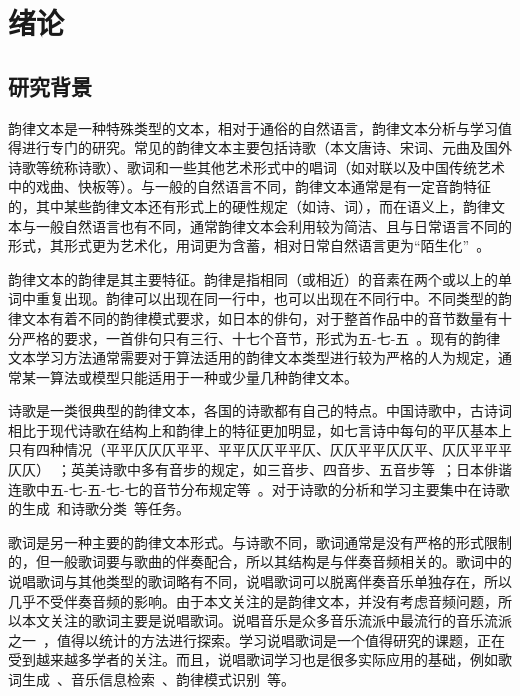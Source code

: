 \chapter{绪论} \label{chpt:A}

\section{研究背景}
韵律文本是一种特殊类型的文本，相对于通俗的自然语言，韵律文本分析与学习值得进行专门的研究。常见的韵律文本主要包括诗歌（本文唐诗、宋词、元曲及国外诗歌等统称诗歌）、歌词和一些其他艺术形式中的唱词（如对联以及中国传统艺术中的戏曲、快板等）。与一般的自然语言不同，韵律文本通常是有一定音韵特征的，其中某些韵律文本还有形式上的硬性规定（如诗、词），而在语义上，韵律文本与一般自然语言也有不同，通常韵律文本会利用较为简洁、且与日常语言不同的形式，其形式更为艺术化，用词更为含蓄，相对日常自然语言更为“陌生化”~\autocite{xiao2008mosheng}。\par

韵律文本的韵律是其主要特征。韵律是指相同（或相近）的音素在两个或以上的单词中重复出现。韵律可以出现在同一行中，也可以出现在不同行中。不同类型的韵律文本有着不同的韵律模式要求，如日本的俳句，对于整首作品中的音节数量有十分严格的要求，一首俳句只有三行、十七个音节，形式为五-七-五~\autocite{wang2016paiju}。现有的韵律文本学习方法通常需要对于算法适用的韵律文本类型进行较为严格的人为规定，通常某一算法或模型只能适用于一种或少量几种韵律文本。\par

诗歌是一类很典型的韵律文本，各国的诗歌都有自己的特点。中国诗歌中，古诗词相比于现代诗歌在结构上和韵律上的特征更加明显，如七言诗中每句的平仄基本上只有四种情况（平平仄仄仄平平、平平仄仄平平仄、仄仄平平仄仄平、仄仄平平平仄仄）~\autocite{song2009pingze}；英美诗歌中多有音步的规定，如三音步、四音步、五音步等~\autocite{zhao2007yingmei}；日本俳谐连歌中五-七-五-七-七的音节分布规定等~\autocite{wang2016paiju}。对于诗歌的分析和学习主要集中在诗歌的生成~\autocite{oliveira2012poetryme,kurzweil2001ray, jiang2015jiyu,he2012generating,mikolov2010recurrent,zhang2014chinese}和诗歌分类~\autocite{jamal2012poetry,lou2015multilabel}等任务。\par

歌词是另一种主要的韵律文本形式。与诗歌不同，歌词通常是没有严格的形式限制的，但一般歌词要与歌曲的伴奏配合，所以其结构是与伴奏音频相关的。歌词中的说唱歌词与其他类型的歌词略有不同，说唱歌词可以脱离伴奏音乐单独存在，所以几乎不受伴奏音频的影响。由于本文关注的是韵律文本，并没有考虑音频问题，所以本文关注的歌词主要是说唱歌词。说唱音乐是众多音乐流派中最流行的音乐流派之一~\autocite{mauch2015evolution}，值得以统计的方法进行探索。学习说唱歌词是一个值得研究的课题，正在受到越来越多学者的关注。而且，说唱歌词学习也是很多实际应用的基础，例如歌词生成~\autocite{Potash2015GhostWriter,Malmi2016dopelearning}、音乐信息检索~\autocite{Malmi2016dopelearning}、韵律模式识别~\autocite{hirjee2009automatic,addanki2013unsupervised}等。\par

